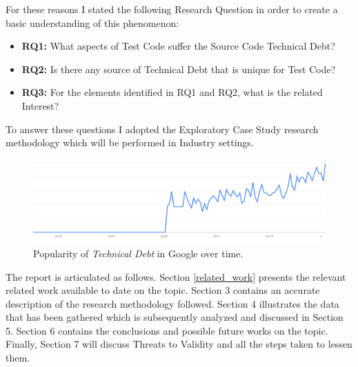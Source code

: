 For these reasons I stated the following Research Question in order to create a basic understanding of this phenomenon:
\begin{itemize}
    \item \textbf{RQ1:} What aspects of Test Code suffer the Source Code Technical Debt?
    \item \textbf{RQ2:} Is there any source of Technical Debt that is unique for Test Code?
    \item \textbf{RQ3:} For the elements identified in RQ1 and RQ2, what is the related Interest?
\end{itemize}
To answer these questions I adopted the Exploratory Case Study research methodology which will be performed in Industry settings.

\begin{figure}[h]
    \centering
    \includegraphics[width=\textwidth]{figure/technicalDebt.pdf}
    \caption{Popularity of \textit{Technical Debt} in Google over time.}
    \label{fig:technical_debt_trend}
\end{figure}

The report is articulated as follows. Section \ref{related_work} presents the relevant related work available to date on the topic. Section 3 contains an accurate description of the research methodology followed. Section 4 illustrates the data that has been gathered which is subsequently analyzed and discussed in Section 5. Section 6 contains the conclusions and possible future works on the topic. Finally, Section 7 will discuss Threats to Validity and all the steps taken to lessen them.


